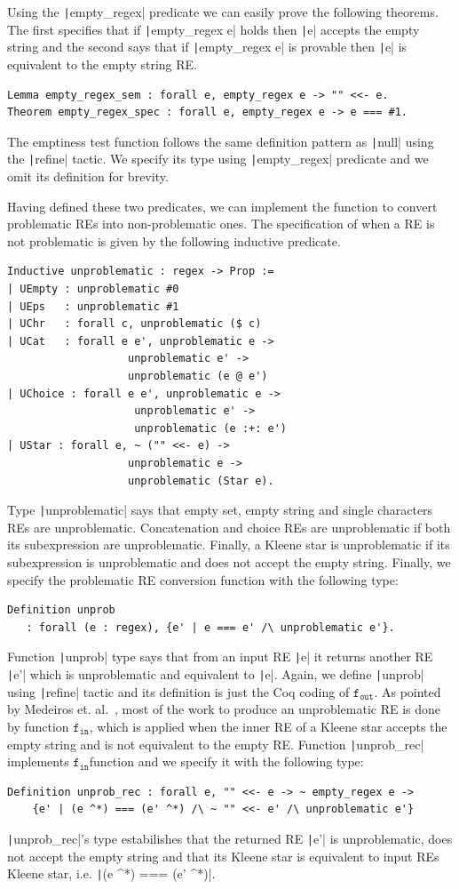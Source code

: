 \documentclass[review]{elsarticle}
\newcommand{\fin}{\ensuremath{\texttt{f$_{\texttt{in}}$}}}
\newcommand{\fout}{\ensuremath{\texttt{f$_{\texttt{out}}$}}}
\newcommand{\coq}[1]{\texttt|#1|}
\theoremstyle{definition}
\begin{document}
Using the \coq{empty_regex} predicate we can easily prove the following
theorems. The first specifies that if \coq{empty_regex e} holds then
\coq{e} accepts the empty string and the second says that if
\coq{empty_regex e} is provable then \coq{e} is equivalent to the empty
string RE.

\begin{verbatim}
Lemma empty_regex_sem : forall e, empty_regex e -> "" <<- e.
Theorem empty_regex_spec : forall e, empty_regex e -> e === #1.
\end{verbatim}

The emptiness test function follows the same definition pattern as \coq{null}
using the \coq{refine} tactic. We specify its type using \coq{empty_regex}
predicate and we omit its definition for brevity.

Having defined these two predicates, we can implement the function to
convert problematic REs into non-problematic ones. The specification
of when a RE is not problematic is given by the following inductive predicate. 
\begin{verbatim}
Inductive unproblematic : regex -> Prop :=
| UEmpty : unproblematic #0
| UEps   : unproblematic #1
| UChr   : forall c, unproblematic ($ c)
| UCat   : forall e e', unproblematic e ->
                   unproblematic e' ->
                   unproblematic (e @ e')
| UChoice : forall e e', unproblematic e ->
                    unproblematic e' ->
                    unproblematic (e :+: e')
| UStar : forall e, ~ ("" <<- e) -> 
                   unproblematic e -> 
                   unproblematic (Star e).
\end{verbatim}
Type \coq{unproblematic} says that empty set, empty string and single
characters REs are unproblematic. Concatenation and choice REs are
unproblematic if both its subexpression are unproblematic. Finally,
a Kleene star is unproblematic if its subexpression is unproblematic and
does not accept the empty string. Finally, we specify the problematic RE
conversion function with the following type:
\begin{verbatim}
Definition unprob 
   : forall (e : regex), {e' | e === e' /\ unproblematic e'}.
\end{verbatim}
Function \coq{unprob} type says that from an input RE \coq{e} it returns another
RE \coq{e'} which is unproblematic and equivalent to \coq{e}. Again, we define
\coq{unprob} using \coq{refine} tactic and its definition is just the
Coq coding of \fout. As pointed by Medeiros et. al.~\cite{Medeiros14}, most of
the work to produce an unproblematic RE is done by function \fin, which is
applied when the inner RE of a Kleene star accepts the empty string and is not
equivalent to the empty RE. Function \coq{unprob_rec} implements \fin function
and we specify it with the following type:
\begin{verbatim}
Definition unprob_rec : forall e, "" <<- e -> ~ empty_regex e -> 
    {e' | (e ^*) === (e' ^*) /\ ~ "" <<- e' /\ unproblematic e'}
\end{verbatim}
\coq{unprob_rec}'s type estabilishes that the returned RE \coq{e'} is unproblematic, does not
accept the empty string and that its Kleene star is equivalent to input REs
Kleene star, i.e.  \coq{(e ^*) === (e' ^*)}.
\end{document}
